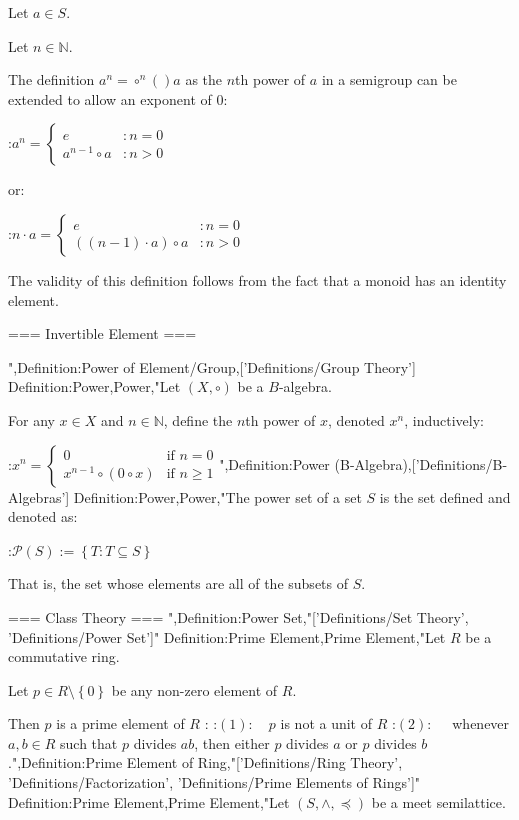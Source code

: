 Let $a \in S$.

Let $n \in \mathbb N$.


The definition $a^n = \circ^n \left(   \right)a$ as the $n$th power of $a$ in a semigroup can be extended to allow an exponent of $0$:

:$a^n = \begin {cases}
e & : n = 0 \\
a^{n - 1} \circ a & : n > 0
\end{cases}$

or:

:$n \cdot a = \begin {cases}
e & : n = 0 \\
\left( \left( n - 1 \right) \cdot a \right) \circ a & : n > 0
\end{cases}$


The validity of this definition follows from the fact that a monoid has an identity element.


=== Invertible Element ===

",Definition:Power of Element/Group,['Definitions/Group Theory']
Definition:Power,Power,"Let $\left( X, \circ \right)$ be a $B$-algebra.

For any $x \in X$ and $n \in \mathbb N$, define the $n$th power of $x$, denoted $x^n$, inductively:

:$x^n = \begin{cases}
0 & \text {if $n = 0$} \\
x^{n - 1} \circ \left( 0 \circ x \right) & \text {if $n \ge 1$}
\end{cases}$",Definition:Power (B-Algebra),['Definitions/B-Algebras']
Definition:Power,Power,"The power set of a set $S$ is the set defined and denoted as:

:$\mathcal P \left( S \right) := \left\lbrace T: T \subseteq S \right\rbrace$

That is, the set whose elements are all of the subsets of $S$.


=== Class Theory ===
",Definition:Power Set,"['Definitions/Set Theory', 'Definitions/Power Set']"
Definition:Prime Element,Prime Element,"Let $R$ be a commutative ring.

Let $p \in R \setminus \left\lbrace 0 \right\rbrace$ be any non-zero element of $R$.


Then $p$ is a prime element of $R$ :
:$(1): \quad p$ is not a unit of $R$ 
:$(2): \quad$ whenever $a, b \in R$ such that $p$ divides $a b$, then either $p$ divides $a$ or $p$ divides $b$.",Definition:Prime Element of Ring,"['Definitions/Ring Theory', 'Definitions/Factorization', 'Definitions/Prime Elements of Rings']"
Definition:Prime Element,Prime Element,"Let $\left( S, \wedge, \preceq \right)$ be a meet semilattice.

